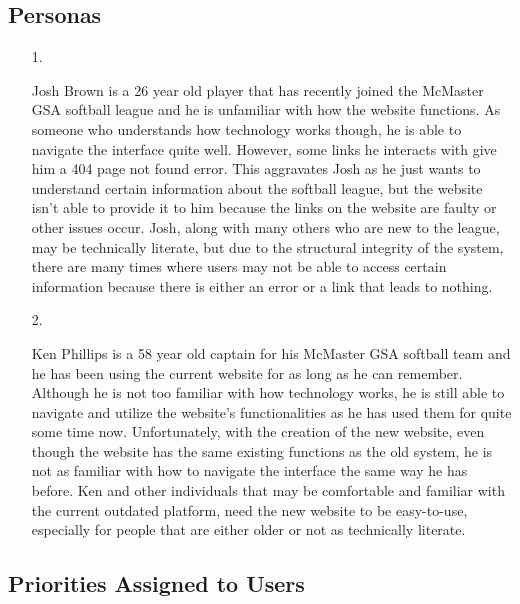 \documentclass[12pt]{article}
\begin{document}
\subsection{Personas}

\begin{itemize}
  \item [1.]
  
  Josh Brown is a 26 year old player that has recently joined the McMaster GSA
  softball league and he is unfamiliar with how the website functions. As someone
  who understands how technology works though, he is able to navigate the interface
  quite well. However, some links he interacts with give him a 404 page not found
  error. This aggravates Josh as he just wants to understand certain information
  about the softball league, but the website isn't able to provide it to him
  because the links on the website are faulty or other issues occur. Josh, along
  with many others who are new to the league, may be technically literate, but due
  to the structural integrity of the system, there are many times where users may
  not be able to access certain information because there is either an error or a
  link that leads to nothing.
  \item [2.]
  
  Ken Phillips is a 58 year old captain for his McMaster GSA softball team and he has
  been using the current website for as long as he can remember. Although he is not
  too familiar with how technology works, he is still able to navigate and utilize the
  website's functionalities as he has used them for quite some time now. Unfortunately,
  with the creation of the new website, even though the website has the same existing
  functions as the old system, he is not as familiar with how to navigate the interface
  the same way he has before. Ken and other individuals that may be comfortable and
  familiar with the current outdated platform, need the new website to be easy-to-use,
  especially for people that are either older or not as technically literate.
\end{itemize}

\subsection{Priorities Assigned to Users}
\end{document}
